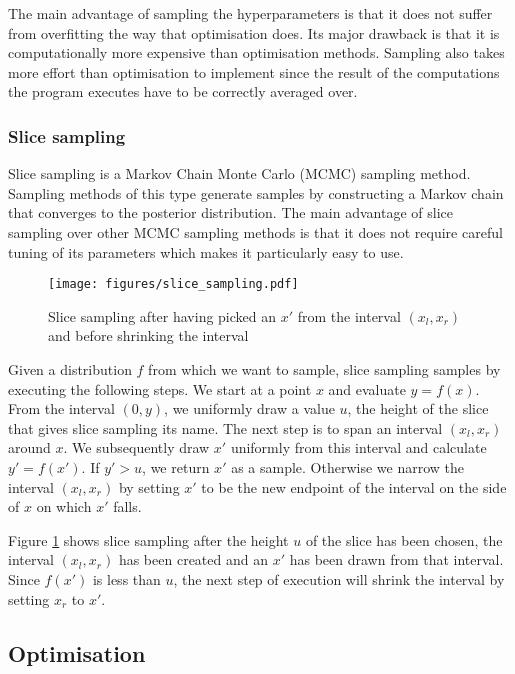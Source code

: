 \documentclass[a4paper,12pt,twoside,openright]{report}
\begin{document}
The main advantage of sampling the hyperparameters is that it does not suffer from overfitting the way that optimisation does. Its major drawback is that it is computationally more expensive than optimisation methods. Sampling also takes more effort than optimisation to implement since the result of the computations the program executes have to be correctly averaged over.

\subsubsection{Slice sampling}

Slice sampling \cite{MacKay:2002:ITI:971143, neal2003} is a Markov Chain Monte Carlo (MCMC) sampling method. Sampling methods of this type generate samples by constructing a Markov chain that converges to the posterior distribution. The main advantage of slice sampling over other MCMC sampling methods is that it does not require careful tuning of its parameters which makes it particularly easy to use.

\begin{figure}[t]
\centering
  \texttt{[image: figures/slice\_sampling.pdf]}
  \caption{Slice sampling after having picked an $x'$ from the interval $(x_l,x_r)$ and before shrinking the interval}
  \label{slsamp}
\end{figure}

Given a distribution $f$ from which we want to sample, slice sampling samples by executing the following steps. We start at a point $x$ and evaluate $y = f(x)$. From the interval $(0, y)$, we uniformly draw a value $u$, the height of the slice that gives slice sampling its name. The next step is to span an interval $(x_l, x_r)$ around $x$. We subsequently draw $x'$ uniformly from this interval and calculate $y' = f(x')$. If $y' > u$, we return $x'$ as a sample. Otherwise we narrow the interval $(x_l, x_r)$ by setting $x'$ to be the new endpoint of the interval on the side of $x$ on which $x'$ falls.

Figure \ref{slsamp} shows slice sampling after the height $u$ of the slice has been chosen, the interval $(x_l, x_r)$ has been created and an $x'$ has been drawn from that interval. Since $f(x')$ is less than $u$, the next step of execution will shrink the interval by setting $x_r$ to $x'$.






\subsection{Optimisation}
\end{document}
